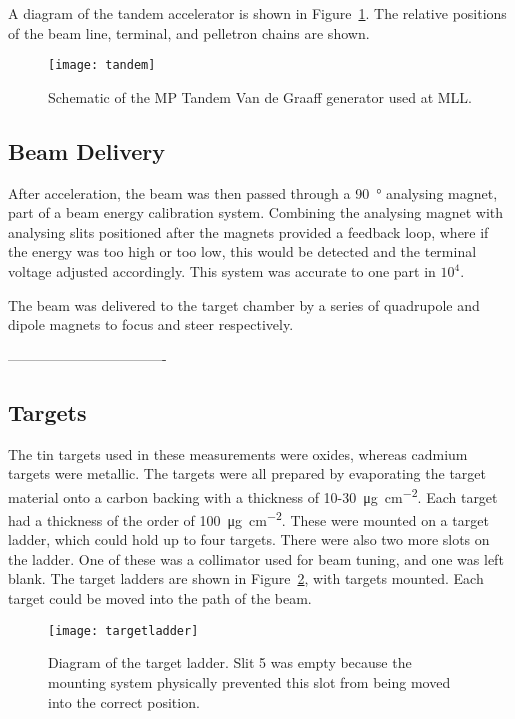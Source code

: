 A diagram of the tandem accelerator is shown in Figure~\ref{tandemDiagram}. The relative positions of the beam line, terminal, and pelletron chains are shown.

\begin{figure}[h]	
\hspace*{-0.5cm}
\begin{center}	
	\texttt{[image: tandem]}
\end{center}
			\caption[Schematic of a MP tandem Van de Graaff accelerator]{Schematic of the MP Tandem Van de Graaff generator used at MLL. }
		\label{tandemDiagram}
\end{figure}
\FloatBarrier

\subsection{Beam Delivery}

After acceleration, the beam was then passed through a \SI{90}{\degree} analysing magnet, part of a beam energy calibration system\cite{dollingerfaestermann}. Combining the analysing magnet with analysing slits positioned after the magnets provided a feedback loop, where if the energy was too high or too low, this would be detected and the terminal voltage adjusted accordingly. This system was accurate to one part in $10^4$.

The beam was delivered to the target chamber by a series of quadrupole and dipole magnets to focus and steer respectively.

 ----------------------------------
\subsection{Targets}
The tin targets used in these measurements were oxides, whereas cadmium targets were metallic. The targets were all prepared by evaporating the target material onto a carbon backing with a thickness of 10-\SI{30}{\micro\gram\per\centi\metre\squared}. Each target had a thickness of the order of \SI{100}{\micro\gram\per\centi\metre\squared}. These were mounted on a target ladder, which could hold up to four targets. There were also two more slots on the ladder. One of these was a collimator used for beam tuning, and one was left blank. The target ladders are shown in Figure~\ref{targetLadder}, with targets mounted. Each target could be moved into the path of the beam.

\begin{figure}[h]	
\hspace*{-0.5cm}
\begin{center}	
	\texttt{[image: targetladder]}
\end{center}
			\caption[Diagram of the MLL target ladder]{Diagram of the target ladder. Slit 5 was empty because the mounting system physically prevented this slot from being moved into the correct position.}
		\label{targetLadder}
\end{figure}
\FloatBarrier

